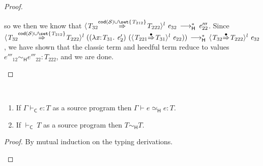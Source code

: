 \documentclass[9pt]{extarticle}
\newcommand{\ottnt}[1]{\mathit{#1}}
\begin{document}
{\begin{lemma}
\begin{proof}
{\begin{itemize}
\begin{itemize}
        so we then we know that $ \langle  \ottnt{T_{{\mathrm{32}}}}  \mathord{ \overset{   \mathsf{cod} ( \mathcal{S} )   \cup   \set{  \ottnt{T_{{\mathrm{212}}}}  }   }{\Rightarrow} }  \ottnt{T_{{\mathrm{222}}}}  \rangle^{ \ottnt{l} } ~  \ottnt{e_{{\mathrm{32}}}}  \,  \longrightarrow ^{*}_{  \mathsf{H}  }  \, \ottnt{e'''_{{\mathrm{22}}}}$. Since $ \langle  \ottnt{T_{{\mathrm{32}}}}  \mathord{ \overset{   \mathsf{cod} ( \mathcal{S} )   \cup   \set{  \ottnt{T_{{\mathrm{212}}}}  }   }{\Rightarrow} }  \ottnt{T_{{\mathrm{222}}}}  \rangle^{ \ottnt{l} } ~   (   (  \lambda \mathit{x} \mathord{:} \ottnt{T_{{\mathrm{31}}}} .~  \ottnt{e'_{{\mathrm{2}}}}  )  ~  (  \langle  \ottnt{T_{{\mathrm{221}}}}  \mathord{ \overset{\bullet}{\Rightarrow} }  \ottnt{T_{{\mathrm{31}}}}  \rangle^{ \ottnt{l} } ~  \ottnt{e_{{\mathrm{22}}}}  )   )   \,  \longrightarrow ^{*}_{  \mathsf{H}  }  \,  \langle  \ottnt{T_{{\mathrm{32}}}}  \mathord{ \overset{\bullet}{\Rightarrow} }  \ottnt{T_{{\mathrm{222}}}}  \rangle^{ \ottnt{l} } ~  \ottnt{e_{{\mathrm{32}}}} $,
        we have shown that the classic term and heedful term reduce to
        values $ \ottnt{e'''_{{\mathrm{12}}}}   \sim _{  \mathsf{H}  }  \ottnt{e'''_{{\mathrm{22}}}}  :  \ottnt{T_{{\mathrm{222}}}} $, and we are done.
      \end{itemize}
    \end{itemize}
    \fi}
  \end{proof}
\end{lemma}

\begin{lemma}
  \label{lem:heedfullr}
  ~

  \noindent
  \begin{enumerate}
  \item \label{hlr:term} If $ \Gamma   \vdash _{  \mathsf{C}  }  \ottnt{e}  :  \ottnt{T} $ as a source program then
    $ \Gamma   \vdash   \ottnt{e}   \simeq _{  \mathsf{H}  }  \ottnt{e}  :  \ottnt{T} $.
  \item \label{hlr:type} If $ \mathord{  \vdash _{  \mathsf{C}  } }~ \ottnt{T} $ as a source program then $ \ottnt{T}   \sim _{  \mathsf{H}  }  \ottnt{T} $.
  \end{enumerate}
\begin{proof}
    By mutual induction on the typing derivations.
    
    {\iffull
}
\end{proof}
\end{lemma}}
\end{document}

